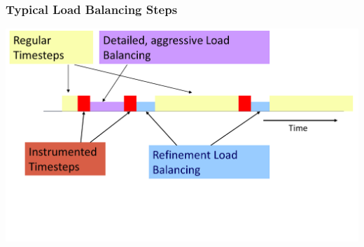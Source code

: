 \begin{frame}[fragile]
\frametitle{Typical Load Balancing Steps}
\begin{centering}
\includegraphics[width=1.0\textwidth]{figures/LBStepsDiagram}
\end{centering}
\end{frame}

